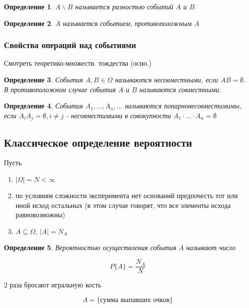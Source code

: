 \documentclass[a4paper, 14pt]{report}
\newtheorem{defenition}{Определение}[section]
\begin{document}
\begin{defenition}
    $A \backslash B$ называется разностью событий $A$ и $B$
\end{defenition}

\begin{defenition}
    $\overline{A}$ называется событием, противоположным $A$
\end{defenition}

\subsubsection{Свойства операций над событиями}

Смотреть теоретико-множеств. тождества (осно.)

\begin{defenition}
    События $A,B \in \Omega$ называются несовместными, если $AB = \emptyset$. В противоположном случае события $A$ и $B$ называются совместными.
\end{defenition}

\begin{defenition}
    События $A_1, \dots, A_n, \dots$ называются попарнонесовместимимы, если $A_i A_j = \emptyset, i \ne j$ - несовместимыми в совокупности $A_1 \cdot \dots \cdot A_n = \emptyset$
\end{defenition}

\subsection{Классическое определение вероятности}

Пусть

\begin{enumerate}
    \item $|\Omega| = N < \infty$
    \item по условиям сложности эксперимента нет оснований предпочесть тот или иной исход остальных (в этом случае говорят, что все элементы исхода равновозможны)
    \item $A \subseteq \Omega,\ |A| = N_A$
\end{enumerate}

\begin{defenition}
    Вероятностью осуществления события $A$ называют число

    $$
    P\{A\} = \frac{N_A}{N}
    $$
\end{defenition}

2 раза бросают игральную кость

$$
A = \{ \text{сумма выпавших очков} \}
$$
\end{document}
